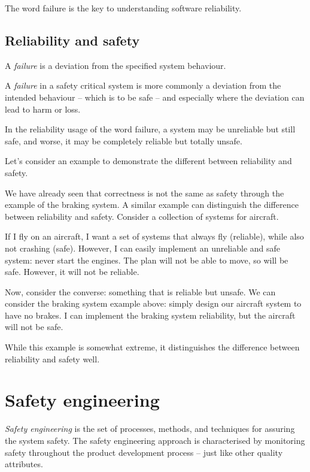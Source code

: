   The word failure is the key to understanding software reliability.




  \subsection*{Reliability and safety}
  
  A \emph{failure} is a deviation from the specified system behaviour.
 
  A \emph{failure} in a safety critical system is more commonly a
  deviation from the intended behaviour -- which is to be safe -- and
  especially where the deviation can lead to harm or loss.

  In the reliability usage of the word failure, a system may be
  unreliable but still safe, and worse, it may be completely reliable
  but totally unsafe.


  \begin{example}
  Let's consider an example to demonstrate the different between reliability and safety.

  We have already seen that correctness is not the same as safety through the example of the braking system. A similar example can distinguish the difference between reliability and safety. Consider a collection of systems for aircraft.

  If I fly on an aircraft, I want a set of systems that always fly (reliable), while also not crashing (safe). However, I can easily implement an unreliable and safe system: never start the engines. The plan will not be able to move, so will be safe. However, it will not be reliable.

  Now, consider the converse: something that is reliable but unsafe. We can consider the braking system example above: simply design our aircraft system to have no brakes. I can implement the braking system reliability, but the aircraft will not be safe.

While this example is somewhat extreme, it distinguishes the difference between reliability and safety well.
  \end{example}


\section{Safety engineering}
  
\emph{Safety engineering} is the set of processes, methods, and techniques for assuring the system safety. The safety engineering approach is characterised by monitoring safety throughout the product development process -- just like other quality attributes.

